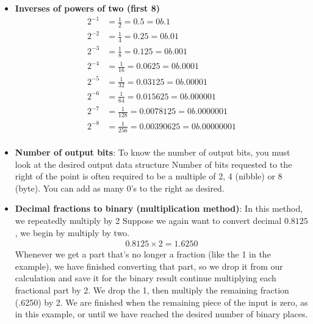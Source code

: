 \documentclass{report}
\begin{document}
\begin{itemize}
        \item \textbf{Inverses of powers of two (first 8)}
            \begin{align*}
                2^{-1} &=  \frac{1}{2} = 0.5 = 0b.1\\
                2^{-2} &= \frac{1}{4} = 0.25 = 0b.01\\
                2^{-3} &= \frac{1}{8} = 0.125 = 0b.001\\
                2^{-4} &= \frac{1}{16} = 0.0625 = 0b.0001\\
                2^{-5} &= \frac{1}{32} = 0.03125 = 0b.00001\\
                2^{-6} &= \frac{1}{64} = 0.015625 = 0b.000001\\
                2^{-7} &= \frac{1}{128} = 0.0078125 = 0b.0000001\\
                2^{-8} &= \frac{1}{256} = 0.00390625 = 0b.00000001\\
            \end{align*}
        \item \textbf{Number of output bits}: To know the number of output bits, you must look at the desired output data structure
            \bigbreak \noindent 
            Number of bits requested to the right of the point is often required to be a multiple of 2, 4 (nibble) or 8 (byte).
            \bigbreak \noindent 
            You can add as many 0’s to the right as desired.
        \item \textbf{Decimal fractions to binary (multiplication method)}: In this method, we repeatedly multiply by 2
            \bigbreak \noindent 
            Suppose we again want to convert decimal $0.8125$, we begin by multiply by two.
            \begin{align*}
                0.8125 \times 2 = 1.6250
            \end{align*}
            Whenever we get a part that’s no longer a fraction (like the 1 in the example), we have finished converting that part, so we drop it from our calculation and save it for the binary result
            \bigbreak \noindent 
            continue multiplying each fractional part by 2.
            \bigbreak \noindent 
            We drop the 1, then multiply the remaining fraction (.6250) by 2.
            \bigbreak \noindent 
            \bigbreak \noindent 
            We are finished when the remaining piece of the input is zero, as in this example, or until we have reached the desired number of binary places.
            \bigbreak \noindent 

\end{itemize}
\end{document}
